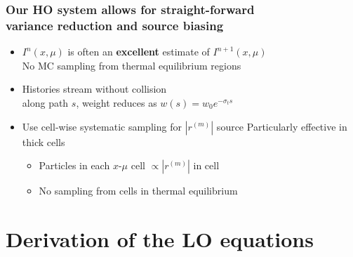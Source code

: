 \documentclass[xcolor=dvipsnames,hyperref={pdfpagelabels=false},unknownkeysallowed]{beamer}
\newcommand{\colb}[1]{{\color{blue} #1}}
\newcommand{\colG}[1]{{\color{Gray!110} #1}}
\newlength{\wideitemsep}
\let\olditem\item
\renewcommand{\item}{\setlength{\itemsep}{\wideitemsep}\olditem}
\begin{document}
\begin{frame}
    \frametitle{Our HO system allows for straight-forward \\ variance reduction and source biasing}
    \addtolength{\wideitemsep}{0.15in}
    \begin{itemize}
        \item[] $I^{n}(x,\mu)$ is often an \colb{\textbf{excellent}} estimate of
            $I^{n+1}(x,\mu)$\\  \colG{No MC sampling from thermal equilibrium regions}
        \item[] Histories stream without collision \\
            \colG{along path $s$, weight reduces as $w(s)=w_0 e^{-\sigma_t s}$}
        \item[] Use cell-wise {systematic} sampling for $|r^{(m)}|$ source
            \colG{Particularly effective in thick cells}
            \begin{itemize}
                    \vspace{0.02in}
                \item Particles in  each $x$-$\mu$ cell $\propto |r^{(m)}|$ in cell
                \vspace{-0.15in}
                \item No sampling from cells in thermal equilibrium
            \end{itemize}
    \end{itemize}
\end{frame}



\section{Derivation of the LO equations}
\subsection{}
\end{document}
